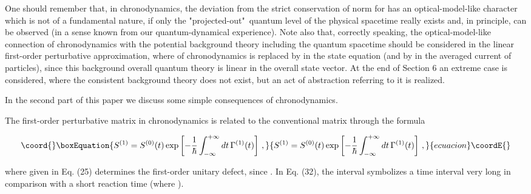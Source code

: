 \documentclass[a4paper,12pt]{article}
\begin{document}
One should remember that, in chronodynamics, the deviation from the strict conser\-vation of norm for \coordHE{} has an optical-model-like character which is not of a fundamental nature, if only the "projected-out"~quantum level of the physical spacetime really exists and, in principle, can be observed (in a sense known from our quantum-dynamical experience). Note also that, correctly speaking, the optical-model-like connection of chronodynamics with the potential background theory including the quantum spacetime should be considered in the linear first-order perturbative approximation, where \coordHE{} of chronodynamics is replaced by \coordHE{} in the state equation (and by \coordHE{} in the averaged current of particles), since this background overall quantum theory is linear in the overall state vector. At the end of Section 6 an extreme case is considered, where the consistent background theory does not exist, but an act of abstraction referring to it is realized.

In the second part of this paper we discuss some simple consequences of chronodynamics.

\vspace{0.25cm}


\vspace{0.25cm}

The first-order perturbative \coordHE{} matrix in chronodynamics is related to the conventional \coordHE{} matrix through the formula

\begin{equation}\coord{}\boxEquation{
S^{(1)} = S^{(0)}(t) \exp \left[-\frac{1}{\hbar} \int^{+\infty}_{-\infty} dt\, \Gamma^{(1)}(t) \right]\,,
}{
S^{(1)} = S^{(0)}(t) \exp \left[-\frac{1}{\hbar} \int^{+\infty}_{-\infty} dt\, \Gamma^{(1)}(t) \right]\,,
}{ecuacion}\coordE{}\end{equation}

\ni where \coordHE{} given in Eq. (25) determines the first-order unitary defect, since \coordHE{}. In Eq. (32), the interval \myHighlight{$-\infty,+\infty$}\coordHE{} symbolizes a time interval  very long in comparison with a short reaction time (where \coordHE{}).
\end{document}
